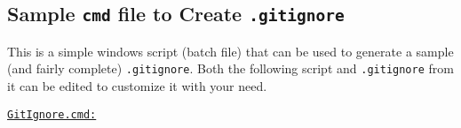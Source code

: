 \vspace*{\baselineskip}
\subsection{Sample \texttt{cmd} file to Create \texttt{.gitignore}}
This is a simple windows script (batch file) that can be used to generate a sample (and fairly complete) \texttt{.gitignore}. Both the following script  and \texttt{.gitignore} from it can be edited to customize it with your need.

{\color{violet}
\begin{singlespace}
	\nl \underline{\texttt{GitIgnore.cmd:}}
	{\footnotesize
	
	}
\end{singlespace}
}